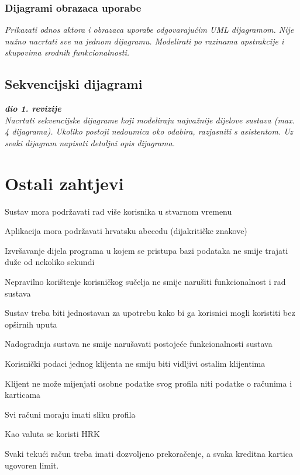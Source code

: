 					
				\subsubsection{Dijagrami obrazaca uporabe}
					
					\textit{Prikazati odnos aktora i obrazaca uporabe odgovarajućim UML dijagramom. Nije nužno nacrtati sve na jednom dijagramu. Modelirati po razinama apstrakcije i skupovima srodnih funkcionalnosti.}
				\eject		
				
			\subsection{Sekvencijski dijagrami}
				
				\textbf{\textit{dio 1. revizije}}\\
				
				\textit{Nacrtati sekvencijske dijagrame koji modeliraju najvažnije dijelove sustava (max. 4 dijagrama). Ukoliko postoji nedoumica oko odabira, razjasniti s asistentom. Uz svaki dijagram napisati detaljni opis dijagrama.}
				\eject
	
		\section{Ostali zahtjevi}
			 
			 
			 \begin{packed_item}
			 	\item Sustav mora podržavati rad više korisnika u stvarnom vremenu
			 	\item Aplikacija mora podržavati hrvatsku abecedu (dijakritičke znakove)
			 	\item Izvršavanje dijela programa u kojem se pristupa bazi podataka ne smije 
			 	trajati duže od nekoliko sekundi 
			 	\item Nepravilno korištenje korisničkog sučelja ne smije narušiti funkcionalnost
			 	i rad sustava	
			 	\item Sustav treba biti jednostavan za upotrebu kako bi ga korisnici mogli koristiti
			 	bez opširnih uputa
			 	\item Nadogradnja sustava ne smije narušavati postojeće funkcionalnosti sustava
			 	\item Korisnički podaci jednog klijenta ne smiju biti vidljivi ostalim klijentima
			 	\item Klijent ne može mijenjati osobne podatke svog profila niti podatke o računima
			 	i karticama
			 	\item Svi računi moraju imati sliku profila
			 	\item Kao valuta se koristi HRK
			 	\item Svaki tekući račun treba imati dozvoljeno prekoračenje, a svaka kreditna kartica ugovoren limit.
			 \end{packed_item}	
			 
			 
			 
	